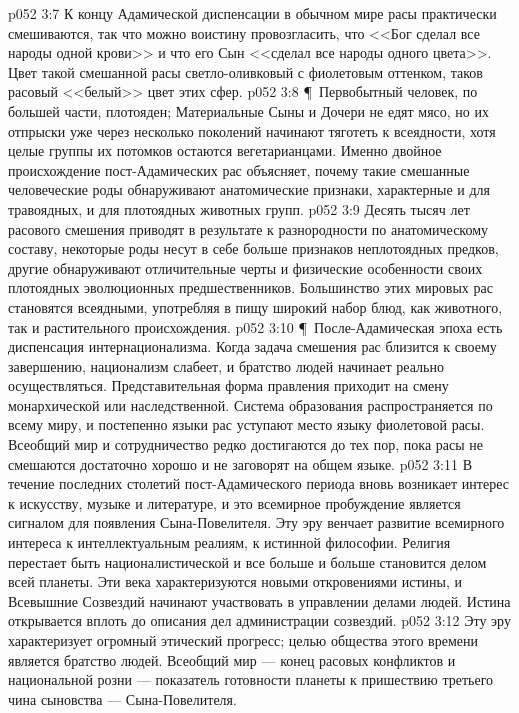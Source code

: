 \vs p052 3:7 К концу Адамической диспенсации в обычном мире расы практически смешиваются, так что можно воистину провозгласить, что <<Бог сделал все народы одной крови>> и что его Сын <<сделал все народы одного цвета>>. Цвет такой смешанной расы светло\hyp{}оливковый с фиолетовым оттенком, таков расовый <<белый>> цвет этих сфер.
\vs p052 3:8 \P\ Первобытный человек, по большей части, плотояден; Материальные Сыны и Дочери не едят мясо, но их отпрыски уже через несколько поколений начинают тяготеть к всеядности, хотя целые группы их потомков остаются вегетарианцами. Именно двойное происхождение пост\hyp{}Адамических рас объясняет, почему такие смешанные человеческие роды обнаруживают анатомические признаки, характерные и для травоядных, и для плотоядных животных групп.
\vs p052 3:9 Десять тысяч лет расового смешения приводят в результате к разнородности по анатомическому составу, некоторые роды несут в себе больше признаков неплотоядных предков, другие обнаруживают отличительные черты и физические особенности своих плотоядных эволюционных предшественников. Большинство этих мировых рас становятся всеядными, употребляя в пищу широкий набор блюд, как животного, так и растительного происхождения.
\vs p052 3:10 \P\ После\hyp{}Адамическая эпоха есть диспенсация интернационализма. Когда задача смешения рас близится к своему завершению, национализм слабеет, и братство людей начинает реально осуществляться. Представительная форма правления приходит на смену монархической или наследственной. Система образования распространяется по всему миру, и постепенно языки рас уступают место языку фиолетовой расы. Всеобщий мир и сотрудничество редко достигаются до тех пор, пока расы не смешаются достаточно хорошо и не заговорят на общем языке.
\vs p052 3:11 В течение последних столетий пост\hyp{}Адамического периода вновь возникает интерес к искусству, музыке и литературе, и это всемирное пробуждение является сигналом для появления Сына\hyp{}Повелителя. Эту эру венчает развитие всемирного интереса к интеллектуальным реалиям, к истинной философии. Религия перестает быть националистической и все больше и больше становится делом всей планеты. Эти века характеризуются новыми откровениями истины, и Всевышние Созвездий начинают участвовать в управлении делами людей. Истина открывается вплоть до описания дел администрации созвездий.
\vs p052 3:12 Эту эру характеризует огромный этический прогресс; целью общества этого времени является братство людей. Всеобщий мир --- конец расовых конфликтов и национальной розни --- показатель готовности планеты к пришествию третьего чина сыновства --- Сына\hyp{}Повелителя.

